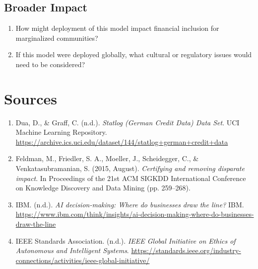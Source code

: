 \documentclass[12pt]{article}
\begin{document}
	\subsection*{Broader Impact}
	\begin{enumerate}
		\item How might deployment of this model impact financial inclusion for marginalized communities?
		\item If this model were deployed globally, what cultural or regulatory issues would need to be considered?
	\end{enumerate}
	
	\pagebreak
	
	\section{Sources}
	\begin{enumerate}
		\item Dua, D., \& Graff, C. (n.d.). \textit{Statlog (German Credit Data) Data Set}. UCI Machine Learning Repository. \url{https://archive.ics.uci.edu/dataset/144/statlog+german+credit+data}
		\item Feldman, M., Friedler, S. A., Moeller, J., Scheidegger, C., \& Venkatasubramanian, S. (2015, August). \textit{Certifying and removing disparate impact}. In Proceedings of the 21st ACM SIGKDD International Conference on Knowledge Discovery and Data Mining (pp. 259--268).
		
		\item IBM. (n.d.). \textit{AI decision-making: Where do businesses draw the line?} IBM. \url{https://www.ibm.com/think/insights/ai-decision-making-where-do-businesses-draw-the-line}
		
		\item IEEE Standards Association. (n.d.). \textit{IEEE Global Initiative on Ethics of Autonomous and Intelligent Systems}. \url{https://standards.ieee.org/industry-connections/activities/ieee-global-initiative/}
		
	\end{enumerate}
	
\end{document}
